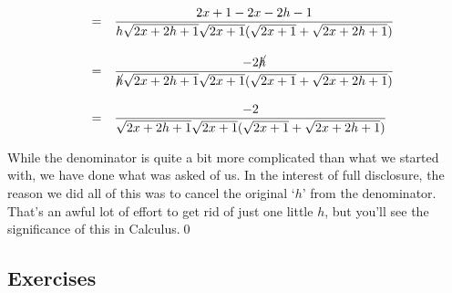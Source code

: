 \documentclass{ximera}
\begin{document}
\begin{example}
\[\begin{array}{rcl}
& = & \dfrac{2x+1 -2x-2h-1}{h\sqrt{2x+2h+1} \sqrt{2x+1}(\sqrt{2x+1} + \sqrt{2x+2h+1})} \\[20pt]

& = & \dfrac{-2\cancel{h}}{\cancel{h}\sqrt{2x+2h+1} \sqrt{2x+1}(\sqrt{2x+1} + \sqrt{2x+2h+1})} \\[20pt]
& = & \dfrac{-2}{\sqrt{2x+2h+1} \sqrt{2x+1}(\sqrt{2x+1} + \sqrt{2x+2h+1})} \\
\end{array}\] 

While the denominator is quite a bit more complicated than what we started with, we have done what was asked of us.  In the interest of full disclosure, the reason we did all of this was to cancel the original `$h$' from the denominator. That's an awful lot of effort to get rid of just one little $h$, but you'll see the significance of this in Calculus.\qed

\end{example}

\newpage

\subsection{Exercises}


\closegraphsfile
\end{document}

